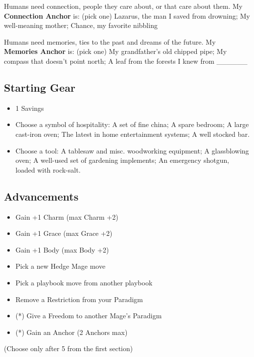 \documentclass[10pt,twoside,openright]{memoir}
\begin{document}
Humans need connection, people they care about, or that care about them.
My \textbf{Connection Anchor} is: (pick one) Lazarus, the man I saved
from drowning; My well-meaning mother; Chance, my favorite nibbling

Humans need memories, ties to the past and dreams of the future. My
\textbf{Memories Anchor} is: (pick one) My grandfather's old chipped
pipe; My compass that doesn't point north; A leaf from the forests I
knew from \_\_\_\_\_\_

\hypertarget{starting-gear-2}{%
\subsection{Starting Gear}\label{starting-gear-2}}

\begin{itemize}
\tightlist
\item
  1 Savings
\item
  Choose a symbol of hospitality: A set of fine china; A spare bedroom;
  A large cast-iron oven; The latest in home entertainment systems; A
  well stocked bar.
\item
  Choose a tool: A tablesaw and misc. woodworking equipment; A
  glassblowing oven; A well-used set of gardening implements; An
  emergency shotgun, loaded with rock-salt.
\end{itemize}

\hypertarget{advancements-2}{%
\subsection{Advancements}\label{advancements-2}}

\begin{itemize}
\tightlist
\item
  Gain +1 Charm (max Charm +2)
\item
  Gain +1 Grace (max Grace +2)
\item
  Gain +1 Body (max Body +2)
\item
  Pick a new Hedge Mage move
\item
  Pick a playbook move from another playbook
\item
  Remove a Restriction from your Paradigm
\item
  (*) Give a Freedom to another Mage's Paradigm
\item
  (*) Gain an Anchor (2 Anchors max)
\end{itemize}

(Choose only after 5 from the first section)
\end{document}

